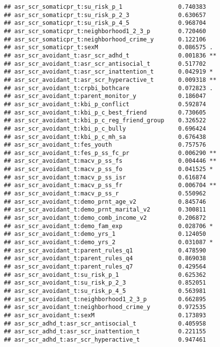 \documentclass[
]{article}
\begin{document}
\begin{verbatim}
## asr_scr_somaticpr_t:su_risk_p_1                0.740383    
## asr_scr_somaticpr_t:su_risk_p_2_3              0.630657    
## asr_scr_somaticpr_t:su_risk_p_4_5              0.968704    
## asr_scr_somaticpr_t:neighborhood1_2_3_p        0.720460    
## asr_scr_somaticpr_t:neighborhood_crime_y       0.122106    
## asr_scr_somaticpr_t:sexM                       0.086575 .  
## asr_scr_avoidant_t:asr_scr_adhd_t              0.001836 ** 
## asr_scr_avoidant_t:asr_scr_antisocial_t        0.517702    
## asr_scr_avoidant_t:asr_scr_inattention_t       0.042919 *  
## asr_scr_avoidant_t:asr_scr_hyperactive_t       0.009318 ** 
## asr_scr_avoidant_t:crpbi_bothcare              0.072823 .  
## asr_scr_avoidant_t:parent_monitor_y            0.186047    
## asr_scr_avoidant_t:kbi_p_conflict              0.592874    
## asr_scr_avoidant_t:kbi_p_c_best_friend         0.730605    
## asr_scr_avoidant_t:kbi_p_c_reg_friend_group    0.326522    
## asr_scr_avoidant_t:kbi_p_c_bully               0.696424    
## asr_scr_avoidant_t:kbi_p_c_mh_sa               0.676438    
## asr_scr_avoidant_t:fes_youth                   0.757576    
## asr_scr_avoidant_t:fes_p_ss_fc_pr              0.006290 ** 
## asr_scr_avoidant_t:macv_p_ss_fs                0.004446 ** 
## asr_scr_avoidant_t:macv_p_ss_fo                0.041525 *  
## asr_scr_avoidant_t:macv_p_ss_isr               0.616874    
## asr_scr_avoidant_t:macv_p_ss_fr                0.006704 ** 
## asr_scr_avoidant_t:macv_p_ss_r                 0.550962    
## asr_scr_avoidant_t:demo_prnt_age_v2            0.845746    
## asr_scr_avoidant_t:demo_prnt_marital_v2        0.300811    
## asr_scr_avoidant_t:demo_comb_income_v2         0.206872    
## asr_scr_avoidant_t:demo_fam_exp                0.028706 *  
## asr_scr_avoidant_t:demo_yrs_1                  0.124050    
## asr_scr_avoidant_t:demo_yrs_2                  0.031087 *  
## asr_scr_avoidant_t:parent_rules_q1             0.478590    
## asr_scr_avoidant_t:parent_rules_q4             0.869038    
## asr_scr_avoidant_t:parent_rules_q7             0.429564    
## asr_scr_avoidant_t:su_risk_p_1                 0.625362    
## asr_scr_avoidant_t:su_risk_p_2_3               0.852051    
## asr_scr_avoidant_t:su_risk_p_4_5               0.563981    
## asr_scr_avoidant_t:neighborhood1_2_3_p         0.662895    
## asr_scr_avoidant_t:neighborhood_crime_y        0.972535    
## asr_scr_avoidant_t:sexM                        0.173893    
## asr_scr_adhd_t:asr_scr_antisocial_t            0.405958    
## asr_scr_adhd_t:asr_scr_inattention_t           0.221155    
## asr_scr_adhd_t:asr_scr_hyperactive_t           0.947461    

\end{verbatim}
\end{document}

